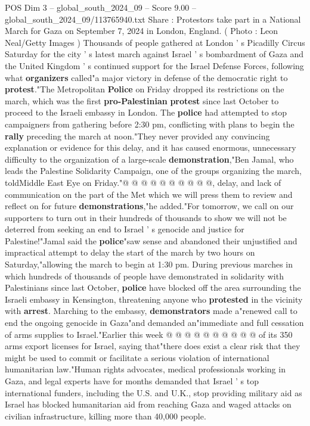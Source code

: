 \begin{textsample}{POS Dim 3 – global\_south\_2024\_09 – Score 9.00 – global\_south\_2024\_09/113765940.txt}  \label{ex:f3_pos_333}
Share : Protestors take part in a National March for Gaza on September 7, 2024 in London, England. ( Photo : Leon Neal/Getty Images ) Thousands of people gathered at London ' s Picadilly Circus Saturday for the city ' s latest march against Israel ' s bombardment of Gaza and the United Kingdom ' s continued support for the Israel Defense Forces, following what \textbf{organizers} called"a major victory in defense of the democratic right to \textbf{protest}."The Metropolitan \textbf{Police} on Friday dropped its restrictions on the march, which was the first \textbf{pro-Palestinian} \textbf{protest} since last October to proceed to the Israeli embassy in London.
The \textbf{police} had attempted to stop campaigners from gathering before 2:30 pm, conflicting with plans to begin the \textbf{rally} preceding the march at noon."They never provided any convincing explanation or evidence for this delay, and it has caused enormous, unnecessary difficulty to the organization of a large-scale \textbf{demonstration},"Ben Jamal, who leads the Palestine Solidarity Campaign, one of the groups organizing the march, toldMiddle East Eye on Friday."@ @ @ @ @ @ @ @ @ @, delay, and lack of communication on the part of the Met which we will press them to review and reflect on for future \textbf{demonstrations},"he added."For tomorrow, we call on our supporters to turn out in their hundreds of thousands to show we will not be deterred from seeking an end to Israel ' s genocide and justice for Palestine!"Jamal said the \textbf{police}"saw sense and abandoned their unjustified and impractical attempt to delay the start of the march by two hours on Saturday,"allowing the march to begin at 1:30 pm.
During previous marches in which hundreds of thousands of people have demonstrated in solidarity with Palestinians since last October, \textbf{police} have blocked off the area surrounding the Israeli embassy in Kensington, threatening anyone who \textbf{protested} in the vicinity with \textbf{arrest}.
Marching to the embassy, \textbf{demonstrators} made a"renewed call to end the ongoing genocide in Gaza"and demanded an"immediate and full cessation of arms supplies to Israel."Earlier this week @ @ @ @ @ @ @ @ @ @ of its 350 arms export licenses for Israel, saying that"there does exist a clear risk that they might be used to commit or facilitate a serious violation of international humanitarian law."Human rights advocates, medical professionals working in Gaza, and legal experts have for months demanded that Israel ' s top international funders, including the U.S. and U.K., stop providing military aid as Israel has blocked humanitarian aid from reaching Gaza and waged attacks on civilian infrastructure, killing more than 40,000 people.

\end{textsample}
